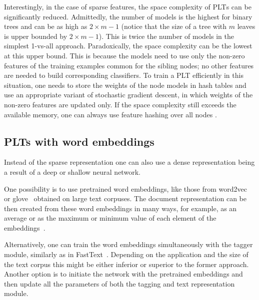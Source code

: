 \documentclass{article}
\newcommand{\Algo}[1]{\textsc{#1}}
\newcommand{\sectionBefore}{-0pt}
\newcommand{\sectionAfter}{-0pt}
\begin{document}
Interestingly, in the case of sparse features, the space complexity of \Algo{PLT}s can be significantly reduced. Admittedly, the number of models is the highest for binary trees and can be as high as $2\times m-1$ (notice that the size of a tree with $m$ leaves is upper bounded by $2\times m-1$). This is twice the number of models in the simplest 1-vs-all approach. Paradoxically, the space complexity can be the lowest at this upper bound. This is because the models need to use only the non-zero features of the training examples common for the sibling nodes; no other features are needed to build corresponding classifiers. To train a \Algo{PLT} efficiently in this situation, one needs to store the weights of the node models in hash tables and use an appropriate variant of stochastic gradient descent, in which weights of the non-zero features are updated only. If the space complexity still exceeds the available memory, one can always use feature hashing over all nodes \cite{Weinberger_et_al_2009}.


\vspace{\sectionBefore}
\subsection{PLTs with word embeddings}
\label{sec:plt-word_embeddings}
\vspace{\sectionAfter}

Instead of the sparse representation one can also use a dense representation being a result of a deep or shallow neural network. %

One possibility is to use pretrained word embeddings, like those from word2vec~\citep{Mikolov_et_al_2013} or glove~\citep{Pennigton_et_al_2014} obtained on large text corpuses. The document representation can be then created from these word embeddings in many ways, for example, as an average or as the maximum or minimum value of each element of the embeddings~\citep{De_Boom_et_al_2016}.

Alternatively, one can train the word embeddings simultaneously with the tagger module, similarly as in FastText~\citep{Joulin_et_al_2016}. Depending on the application and the size of the text corpus this might be either inferior or superior to the former approach. Another option is to initiate the network with the pretrained embeddings and then update all the parameters of both the tagging and text representation module. 
\end{document}
